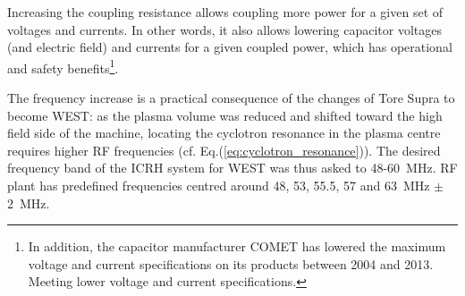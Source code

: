 Increasing the coupling resistance allows coupling more power for a given set of voltages and currents. In other words, it also allows lowering capacitor voltages (and electric field) and currents for a given coupled power, which has operational and safety benefits\footnote{In addition, the capacitor manufacturer COMET has lowered the maximum voltage and current specifications on its products between 2004 and 2013. Meeting lower voltage and current specifications.}. 

The frequency increase is a practical consequence of the changes of Tore Supra to become WEST: as the plasma volume was reduced and  shifted toward the high field side of the machine, locating the cyclotron resonance in the plasma centre requires higher RF frequencies (cf. Eq.(\ref{eq:cyclotron_resonance})). The desired frequency band of the ICRH system for WEST was thus asked to 48-60~MHz. RF plant has predefined frequencies centred around 48, 53, 55.5, 57 and 63~MHz $\pm$ 2~MHz.
 
